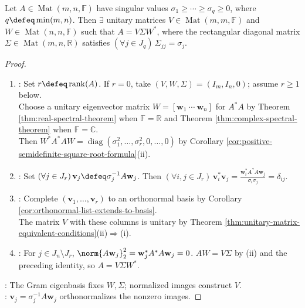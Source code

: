 \begin{theorem} \label{thm:matrix-singular-value-decomposition} \\
Let $A\in\operatorname{Mat}(m,n,\mathbb{F})$ have singular values $\sigma_1\geq\cdots\geq\sigma_q\geq0$, where $q\defeq\min(m,n)$. Then $\exists$ unitary matrices $V\in\operatorname{Mat}(m,m,\mathbb{F})$ and $W\in\operatorname{Mat}(n,n,\mathbb{F})$ such that $A=V\Sigma W^*$, where the rectangular diagonal matrix $\Sigma\in\operatorname{Mat}(m,n,\mathbb{R})$ satisfies $(\forall j\in J_q)\,\Sigma_{jj}=\sigma_j$.
\begin{proof}
\begin{enumerate}[label=(\roman*)]
\setlength{\itemsep}{0pt}
\item {}: Set $r\defeq\operatorname{rank}(A)$. If $r=0$, take $(V,W,\Sigma)=(I_m,I_n,0)$; assume $r\geq1$ below.\\
Choose a unitary eigenvector matrix $W=[\mathbf{w}_1\ \cdots\ \mathbf{w}_n]$ for $A^*A$ by Theorem \ref{thm:real-spectral-theorem} when $\mathbb{F}=\mathbb{R}$ and Theorem \ref{thm:complex-spectral-theorem} when $\mathbb{F}=\mathbb{C}$.\\
Then $W^*A^*AW=\operatorname{diag}(\sigma_1^2,\ldots,\sigma_r^2,0,\ldots,0)$ by Corollary \ref{cor:positive-semidefinite-square-root-formula}(ii).
\item {}: Set $(\forall j\in J_r)\,\mathbf{v}_j\defeq\sigma_j^{-1}A\mathbf{w}_j$. Then $(\forall i,j\in J_r)\,\mathbf{v}_i^*\mathbf{v}_j=\frac{\mathbf{w}_i^*A^*A\mathbf{w}_j}{\sigma_i\sigma_j}=\delta_{ij}$.
\item {}: Complete $(\mathbf{v}_1,\ldots,\mathbf{v}_r)$ to an orthonormal basis by Corollary \ref{cor:orthonormal-list-extends-to-basis}.\\
The matrix $V$ with these columns is unitary by Theorem \ref{thm:unitary-matrix-equivalent-conditions}(ii)$\Rightarrow$(i).
\item {}: For $j\in J_n\setminus J_r$, $\norm{A\mathbf{w}_j}_2^2=\mathbf{w}_j^*A^*A\mathbf{w}_j=0$. $AW=V\Sigma$ by (ii) and the preceding identity, so $A=V\Sigma W^*$.
\end{enumerate}
: The Gram eigenbasis fixes $W,\Sigma$; normalized images construct $V$.\\
: $\mathbf{v}_j=\sigma_j^{-1}A\mathbf{w}_j$ orthonormalizes the nonzero images.
\end{proof}
\end{theorem}

